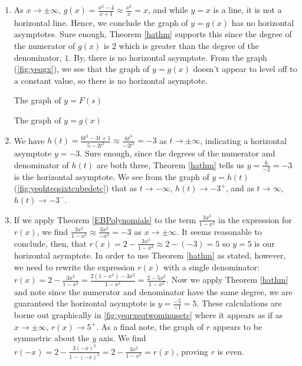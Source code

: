 \begin{ex}
\begin{enumerate}
\item  As $x \rightarrow \pm \infty$, $g(x) = \frac{x^2-4}{x+1} \approx \frac{x^2}{x} = x$, and while $y = x$ is a line, it is not a horizontal line.  Hence, we conclude the graph of $y = g(x)$ has no horizontal asymptotes.  Sure enough,  Theorem \ref{hathm} supports this since the degree of the numerator of $g(x)$ is $2$ which is greater than the degree of the denominator, $1$.     By, there is no horizontal asymptote.  From the graph (\autoref{fig:yeqgx}), we see that the graph of $y=g(x)$ doesn't appear to level off to a constant value, so there is no horizontal asymptote.

\begin{mfigure}


\caption{The graph of $y=F(s)$}
\label{fig:yeqfseqfivesetc}
\end{mfigure}

\begin{mfigure}
  
\caption{The graph of $y=g(x)$}
\label{fig:yeqgx}
\end{mfigure}

\item  We have $h(t) = \frac{6t^3-3t+1}{5-2t^3} \approx  \frac{6t^3}{-2t^3} = -3$ as $t \rightarrow \pm \infty$, indicating a horizontal asymptote $y = -3$.  Sure enough, since the degrees of the numerator and denominator of $h(t)$ are both three,  Theorem \ref{hathm} tells us $y = \frac{6}{-2} = -3$ is the horizontal asymptote.  We see from the graph of $y = h(t)$ (\autoref{fig:yeqhteqsixtcubedetc}) that as $t \rightarrow -\infty$, $h(t) \rightarrow -3^{+}$, and as $t \rightarrow \infty$, $h(t) \rightarrow -3^{-}$.

\item  If we apply Theorem \ref{EBPolynomials} to the term  $\frac{3x^2}{1-x^2}$ in the expression for $r(x)$, we find   $\frac{3x^2}{1-x^2} \approx \frac{3x^2}{-x^2} = -3$ as $x \rightarrow \pm \infty$.  It  seems reasonable to conclude, then, that  $r(x) = 2 - \frac{3x^2}{1-x^2} \approx 2 - (-3) = 5$ so $y = 5$ is our horizontal asymptote.  In order to use Theorem \ref{hathm} as stated, however, we need to rewrite the expression $r(x)$ with a single denominator:  $r(x) = 2 - \frac{3x^2}{1-x^2} = \frac{2(1-x^2) - 3x^2}{1-x^2} = \frac{2-5x^2}{1-x^2}$.  Now we apply Theorem \ref{hathm}  and note since the numerator and denominator have the same degree, we are guaranteed the horizontal asymptote is $y = \frac{-5}{-1} = 5$.  These calculations are borne out graphically in \autoref{fig:yeqrxeqtwominusetc} where it appears as if as $x \rightarrow \pm \infty$, $r(x) \rightarrow 5^{+}$.  As a final note, the graph of $r$ appears to be symmetric about the $y$ axis.  We find $r(-x) = 2 - \frac{3(-x)^2}{1-(-x)^2} = 2 - \frac{3x^2}{1-x^2} = r(x)$, proving $r$ is even.


\end{enumerate}
\end{ex}
